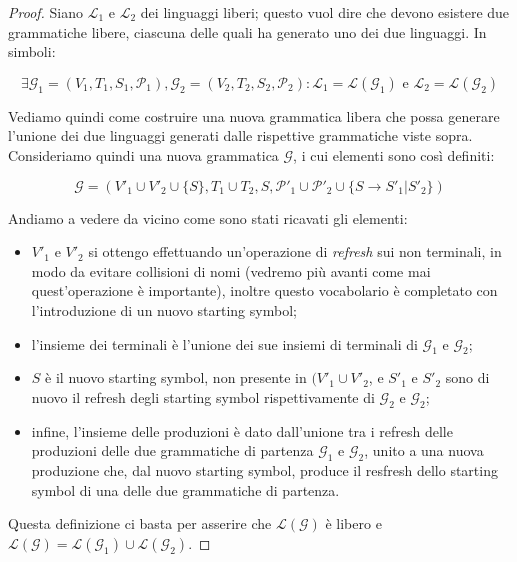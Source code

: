 \documentclass[class=book, crop=false, oneside]{standalone}
\begin{document}
\begin{proof}
    Siano \(\mathcal{L}_1\) e \(\mathcal{L}_2\) dei linguaggi liberi; questo vuol dire che devono esistere due grammatiche libere, ciascuna delle quali ha generato uno dei due linguaggi. In simboli:

  \begin{equation*}
    \exists \mathcal{G}_1 = (V_1, T_1, S_1, \mathcal{P}_1), \mathcal{G}_2 = (V_2, T_2, S_2, \mathcal{P}_2) : \mathcal{L}_1 = \mathcal{L}(\mathcal{G}_1) \textrm{ e } \mathcal{L}_2 = \mathcal{L}(\mathcal{G}_2)
  \end{equation*}

  Vediamo quindi come costruire una nuova grammatica libera che possa generare l'unione dei due linguaggi generati dalle rispettive grammatiche viste sopra. Consideriamo quindi una nuova grammatica \(\mathcal{G}\), i cui elementi sono così definiti:

  \begin{equation*}
      \mathcal{G} = (V'_1 \cup V'_2 \cup \{S\}, T_1 \cup T_2, S, \mathcal{P}'_1 \cup \mathcal{P}'_2 \cup \{S \rightarrow S'_1 | S'_2\})
  \end{equation*}

  \noindent Andiamo a vedere da vicino come sono stati ricavati gli elementi:

  \begin{itemize}
    \item \(V'_1\) e \(V'_2\) si ottengo effettuando un'operazione di \emph{refresh} sui non terminali, in modo da evitare collisioni di nomi (vedremo più avanti come mai quest'operazione è importante), inoltre questo vocabolario è completato con l'introduzione di un nuovo starting symbol;
    \item l'insieme dei terminali è l'unione dei sue insiemi di terminali di \(\mathcal{G}_1\) e \(\mathcal{G}_2\);
    \item \(S\) è il nuovo starting symbol, non presente in \((V'_1 \cup V'_2\), e \(S'_1\) e \(S'_2\) sono di nuovo il refresh degli starting symbol rispettivamente di \(\mathcal{G}_2\) e \(\mathcal{G}_2\);
    \item infine, l'insieme delle produzioni è dato dall'unione tra i refresh delle produzioni delle due grammatiche di partenza  \(\mathcal{G}_1\) e \(\mathcal{G}_2\), unito a una nuova produzione che, dal nuovo starting symbol, produce il resfresh dello starting symbol di una delle due grammatiche di partenza.
  \end{itemize}

  \noindent Questa definizione ci basta per asserire che \(\mathcal{L(G)}\) è libero e \(\mathcal{L(G)} = \mathcal{L}(\mathcal{G}_1)  \cup \mathcal{L}(\mathcal{G}_2) \).

\end{proof}
\end{document}
